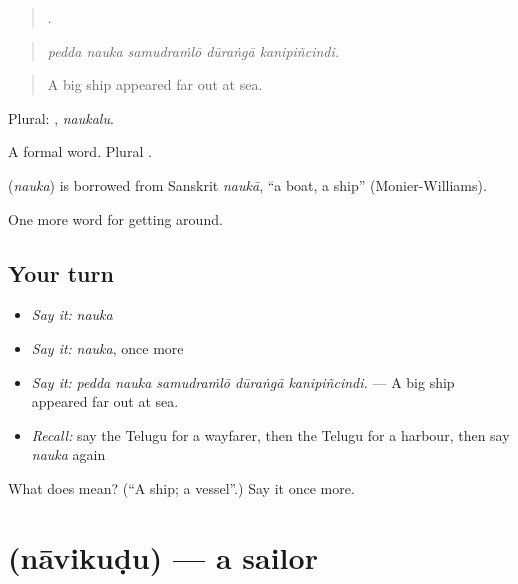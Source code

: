 \begin{quote}
    .
\end{quote}

\begin{quote}
\emph{pedda nauka samudraṁlō dūraṅgā kanipiñcindi.}
\end{quote}

\begin{quote}
A big ship appeared far out at sea.
\end{quote}

Plural: , \emph{naukalu}.

A formal word. Plural .

\begin{cousinweb}
\textbf{} (\emph{nauka}) is borrowed from Sanskrit \emph{naukā}, \textquotedblleft{}a boat, a ship\textquotedblright{} (Monier-Williams).
\end{cousinweb}

\begin{grammarlens}[title={What you've built}]
One more word for getting around.
\end{grammarlens}

\subsection*{Your turn}
\begin{itemize}
\raggedright
  \item \emph{Say it:} \emph{nauka}
  \item \emph{Say it:} \emph{nauka}, once more
  \item \emph{Say it:} \emph{pedda nauka samudraṁlō dūraṅgā kanipiñcindi.} — A big ship appeared far out at sea.
  \item \emph{Recall:} say the Telugu for a wayfarer, then the Telugu for a harbour, then say \emph{nauka} again
\end{itemize}

\begin{tcolorbox}[breakable,colback=teal!4,colframe=teal!35!black,title={Before you move on}]
What does  mean? (\textquotedblleft{}A ship; a vessel\textquotedblright{}.) Say it once more.
\end{tcolorbox}
\section[\texorpdfstring{\te{నావికుడు} (nāvikuḍu)}{నావికుడు (nāvikuḍu)}]{ (nāvikuḍu) — a sailor}

